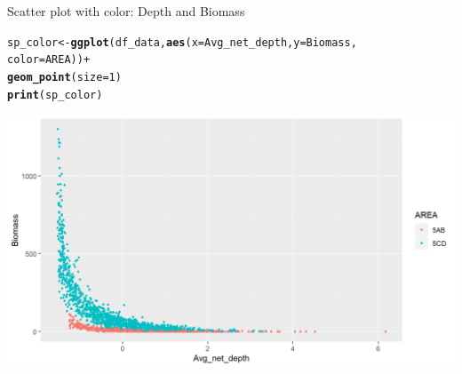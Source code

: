 \documentclass{beamer}\usepackage[]{graphicx}\usepackage[]{color}
\makeatletter
\newcommand{\hlnum}[1]{\textcolor[rgb]{0.686,0.059,0.569}{#1}}%
\newcommand{\hlopt}[1]{\textcolor[rgb]{0,0,0}{#1}}%
\newcommand{\hlstd}[1]{\textcolor[rgb]{0.345,0.345,0.345}{#1}}%
\newcommand{\hlkwb}[1]{\textcolor[rgb]{0.69,0.353,0.396}{#1}}%
\newcommand{\hlkwc}[1]{\textcolor[rgb]{0.333,0.667,0.333}{#1}}%
\newcommand{\hlkwd}[1]{\textcolor[rgb]{0.737,0.353,0.396}{\textbf{#1}}}%
\newenvironment{kframe}{%
 \def\at@end@of@kframe{}%
 \ifinner\ifhmode%
  \def\at@end@of@kframe{\end{minipage}}%
  \begin{minipage}{\columnwidth}%
 \fi\fi%
 \def\FrameCommand##1{\hskip\@totalleftmargin \hskip-\fboxsep
 \colorbox{shadecolor}{##1}\hskip-\fboxsep
     \hskip-\linewidth \hskip-\@totalleftmargin \hskip\columnwidth}%
 \MakeFramed {\advance\hsize-\width
   \@totalleftmargin\z@ \linewidth\hsize
   \@setminipage}}%
 {\par\unskip\endMakeFramed%
 \at@end@of@kframe}
\newenvironment{knitrout}{}{} %
\makeatother
\begin{document}
\begin{frame}[fragile]{Scatter plot with color: Depth and Biomass}
\begin{knitrout}\footnotesize
{}\color{fgcolor}\begin{kframe}
\begin{alltt}
\hlstd{sp_color} \hlkwb{<-} \hlkwd{ggplot}\hlstd{(df_data,} \hlkwd{aes}\hlstd{(}\hlkwc{x}\hlstd{=Avg_net_depth,} \hlkwc{y}\hlstd{=Biomass,}
                                \hlkwc{color}\hlstd{=AREA))} \hlopt{+}
  \hlkwd{geom_point}\hlstd{(}\hlkwc{size}\hlstd{=}\hlnum{1}\hlstd{)}
\hlkwd{print}\hlstd{(sp_color)}
\end{alltt}
\end{kframe}

{\centering \includegraphics[width=.9\linewidth]{figure/sp_color-1} 

}



\end{knitrout}
\end{frame}
\end{document}
